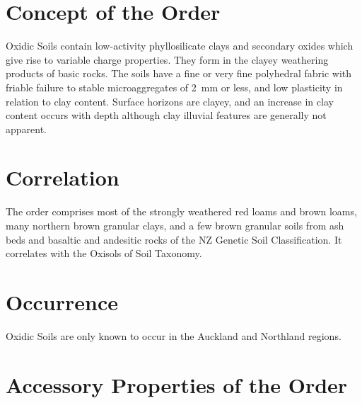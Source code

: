 \documentclass[
  letterpaper,
  DIV=11,
  numbers=noendperiod]{scrreprt}
\begin{document}
\hypertarget{sec-con-X}{%
\section{Concept of the Order}\label{sec-con-X}}

Oxidic Soils contain low-activity phyllosilicate clays and secondary
oxides which give rise to variable charge properties. They form in the
clayey weathering products of basic rocks. The soils have a fine or very
fine polyhedral fabric with friable failure to stable microaggregates of
2~mm or less, and low plasticity in relation to clay content. Surface
horizons are clayey, and an increase in clay content occurs with depth
although clay illuvial features are generally not apparent.

\hypertarget{sec-cor-X}{%
\section{Correlation}\label{sec-cor-X}}

The order comprises most of the strongly weathered red loams and brown
loams, many northern brown granular clays, and a few brown granular
soils from ash beds and basaltic and andesitic rocks of the NZ Genetic
Soil Classification. It correlates with the Oxisols of Soil Taxonomy.

\hypertarget{sec-occ-X}{%
\section{Occurrence}\label{sec-occ-X}}

Oxidic Soils are only known to occur in the Auckland and Northland
regions.

\hypertarget{sec-acc-X}{%
\section{Accessory Properties of the Order}\label{sec-acc-X}}
\end{document}

